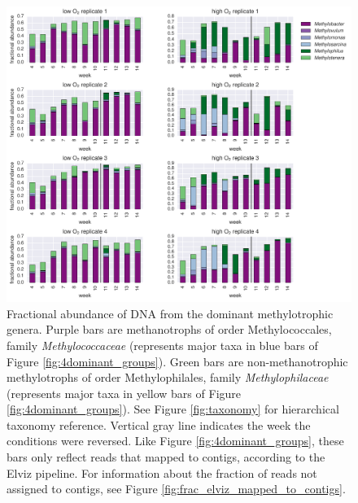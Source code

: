 \begin{figure}[H]
\centering
    \includegraphics[width=1.0\textwidth]{./tex/chapter2/figures/170313_methanotroph_methylotroph_taxa--portrait.pdf}  %
    \begin{singlespace}
    \caption[Dominant methanotrophic and methylotrophic genera]{
        Fractional abundance of DNA from the dominant methylotrophic genera.
        Purple bars are methanotrophs of order Methylococcales, family \textit{Methylococcaceae}
            (represents major taxa in blue bars of Figure \ref{fig:4dominant_groups}).
        Green bars are non-methanotrophic methylotrophs of order Methylophilales, family \textit{Methylophilaceae}
            (represents major taxa in yellow bars of Figure \ref{fig:4dominant_groups}).
        See Figure \ref{fig:taxonomy} for hierarchical taxonomy reference.
        Vertical gray line indicates the week the  conditions were reversed.
        Like Figure \ref{fig:4dominant_groups}, these bars only reflect reads that mapped to contigs, according to the Elviz pipeline.
        For information about the fraction of reads not assigned to contigs, see Figure \ref{fig:frac_elviz_mapped_to_contigs}.
        }  %
    \label{fig:dominant_genera}
    \end{singlespace}
\end{figure}

